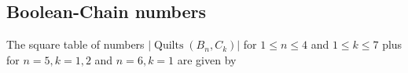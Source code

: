 \documentclass[12pt]{amsart}
\numberwithin{equation}{section}
\theoremstyle{definition}
\newcommand{\quilt}{\operatorname{Quilts}}
\begin{document}


\subsection{Boolean-Chain numbers}

The square table of numbers $|\quilt(B_{n}, C_{k})|$ for $1\leq
n\leq 4$ and $1\leq k\leq 7$ plus for $n=5,k=1,2$ and $n=6,k=1$ are given by

\end{document}
